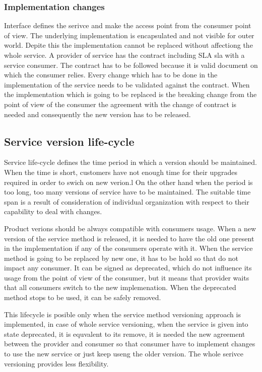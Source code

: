 \subsubsection{Implementation changes}
Interface defines the serivce and make the access point from the consumer point of view. The underlying implementation is encapsulated and not visible for outer world. Depite this the implementation cannot be replaced without affectiong the whole service. A provider of service has the contract including SLA \gls{sla} with a service consumer. The contract has to be followed because it is valid document on which the consumer relies. 
Every change which has to be done in the implementation of the service needs to be validated against the contract. When the implementation which is going to be replaced is the breaking change from the point of view of the consumer the agreement with the change of contract is needed and consequently the new version has to be released.

\subsection{Service version life-cycle}
Service life-cycle defines the time period in which a version should be maintained. When the time is short, customers have not enough time for their upgrades required in order to swich on new verion.l On the other hand when the period is too long, too many versions of service have to be maintained. The suitable time span is a result of consideration of individual organization with respect to their capability to deal with changes.

Product verions should be always compatible with consumers usage. When a new version of the service method is released, it is needed to have the old one present in the implementation if any of the consumers operate with it. When the service method is going to be replaced by new one, it has to be hold so that do not impact any consumer. It can be signed as deprecated, which do not influence its usage from the point of view of the consumer, but it means that provider waits that all consumers switch to the new implemenation. When the deprecated method stops to be used, it can be safely removed. 

This lifecycle is posible only when the service method versioning approach is implemented, in case of whole service versioning, when the service is given into state deprecated, it is equvalent to its remove, it is needed the new agreement between the provider and consumer so that consumer have to implement changes to use the new service or just  keep useng the older version. The whole serivce versioning provides less flexibility.


